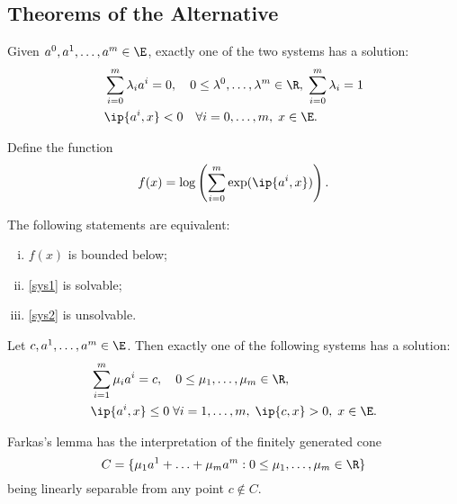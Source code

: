 \documentclass[../borwein-lewis_notes.tex]{subfiles}
\begin{document}
\subsection{Theorems of the Alternative}
\begin{theorem}[2.2.1 (Gordan)]
Given $a^0,a^1,\ldots, a^m\in \E$, exactly one of the two systems has 
a solution:
\begin{align}
\label{sys1}
&\sum_{i=0}^m \lambda_i a^i = 0,\quad 0\leq\lambda^0,\ldots,\lambda^m\in\R,
\; \sum_{i=0}^m \lambda_i=1 \\
\label{sys2}
&\ip{a^i, x} < 0 \quad \forall i=0,\ldots, m,\;x\in \E.
\end{align}
\end{theorem}
Define the function 
\begin{equation*}
f(x) = \log\left(\sum_{i=0}^m \exp(\ip{a^i, x})\right).
\end{equation*}
\begin{theorem}[2.2.6]
\label{226theorem}
The following statements are equivalent:
\begin{enumerate}[(i)]
\item $f(x)$ is bounded below;
\item \eqref{sys1} is solvable;
\item \eqref{sys2} is unsolvable.
\end{enumerate}
\end{theorem}
\begin{lemma}[2.2.7 (Farkas)]
Let $c, a^1,\ldots, a^m\in\E$. Then exactly one of the following systems 
has a solution:
\begin{align}
\label{sys223}
&\sum_{i=1}^m \mu_i a^i = c, \quad 0\leq \mu_1,\ldots,\mu_m \in \R,\\
\label{sys224}
&\ip{a^i, x}\leq 0 \; \forall i=1,\ldots, m, \; \ip{c,x} > 0, \;
x\in\E.
\end{align}
\end{lemma}
Farkas's lemma has the interpretation of the finitely generated cone 
\begin{equation*}
C = \{\mu_1 a^1 + \ldots + \mu_m a^m : 0\leq \mu_1,\ldots,\mu_m\in \R\}
\end{equation*}
being linearly separable from any point $c\notin C$. 
\end{document}

